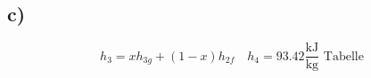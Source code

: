 

\subsection*{c)}
\[
h_3 = x h_{3g} + (1 - x) h_{2f} \quad h_4 = 93.42 \frac{\text{kJ}}{\text{kg}} \text{ Tabelle}
\]